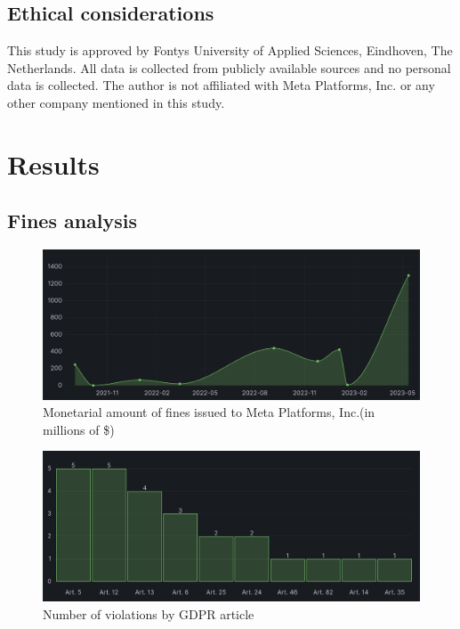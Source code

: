 \documentclass[12pt, a4paper]{article}
\begin{document}
\subsection*{Ethical considerations}

This study is approved by Fontys University of Applied Sciences, Eindhoven, The
Netherlands. All data is collected from publicly available sources and no
personal data is collected. The author is not affiliated with Meta Platforms,
Inc. or any other company mentioned in this study.

\section*{Results}

\subsection*{Fines analysis}



\begin{figure}[h]
    \centering
    \includegraphics[width=1.00\textwidth]{monetarial-amount-of-gdpr-fines}
    \caption{Monetarial amount of fines issued to Meta Platforms, Inc.(in
    millions of
    \$)\cite{gdprFine1,gdprFine2,gdprFine3,gdprFine4,gdprFine5,gdprFine6,gdprFine7,gdprFine8,gdprFine9}}
    \label{fig:amount-of-gdpr-fines}
\end{figure}

\begin{figure}[h]
    \centering
    \includegraphics[width=1.00\textwidth]{violations-by-article}
    \caption{Number of violations by GDPR
    article\cite{gdprFine1,gdprFine2,gdprFine3,gdprFine4,gdprFine5,gdprFine6,gdprFine7,gdprFine8,gdprFine9}}
    \label{fig:violations-by-article}
\end{figure}
\end{document}
